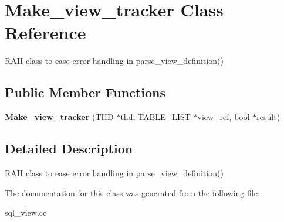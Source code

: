 \hypertarget{classMake__view__tracker}{}\section{Make\+\_\+view\+\_\+tracker Class Reference}
\label{classMake__view__tracker}


R\+A\+II class to ease error handling in parse\+\_\+view\+\_\+definition()  


\subsection*{Public Member Functions}
\begin{DoxyCompactItemize}
\item 
\mbox{\label{classMake__view__tracker_abeee8e62401d234190059e9c870d0831}} 
{\bfseries Make\+\_\+view\+\_\+tracker} (T\+HD $\ast$thd, \mbox{\hyperlink{structTABLE__LIST}{T\+A\+B\+L\+E\+\_\+\+L\+I\+ST}} $\ast$view\+\_\+ref, bool $\ast$result)
\end{DoxyCompactItemize}


\subsection{Detailed Description}
R\+A\+II class to ease error handling in parse\+\_\+view\+\_\+definition() 

The documentation for this class was generated from the following file\+:\begin{DoxyCompactItemize}
\item 
sql\+\_\+view.\+cc\end{DoxyCompactItemize}
